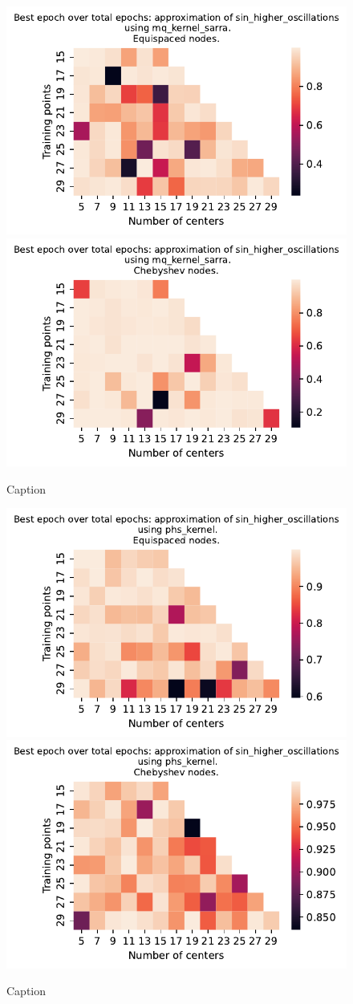 \documentclass[12pt]{report} %
\begin{document}
\begin{figure}[ht]
    \centering
    
    \includegraphics[width=.49\textwidth]{imagenes/experiments/1d/variational_epochs/sin_higher_oscillations-Kmq_kernel_sarra-Equi-epochs.pdf}
    \includegraphics[width=.49\textwidth]{imagenes/experiments/1d/variational_epochs/sin_higher_oscillations-Kmq_kernel_sarra-Cheb-epochs.pdf}
    \caption{Caption}
    \label{fig:epochs-sin-higher-oscillations-sarra}
\end{figure}

\begin{figure}[ht]
    \centering
    
    \includegraphics[width=.49\textwidth]{imagenes/experiments/1d/variational_epochs/sin_higher_oscillations-Kphs_kernel-Equi-epochs.pdf}
    \includegraphics[width=.49\textwidth]{imagenes/experiments/1d/variational_epochs/sin_higher_oscillations-Kphs_kernel-Cheb-epochs.pdf}
    \caption{Caption}
    \label{fig:epochs-sin-higher-oscillations-phs}
\end{figure}
\end{document}
